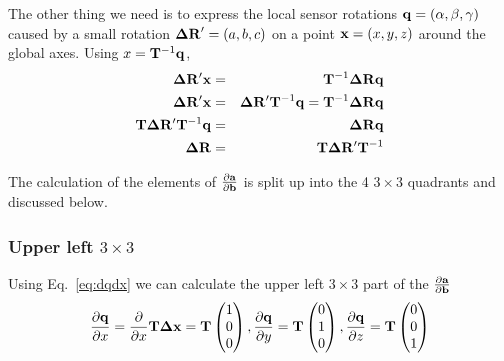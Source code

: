 \documentclass{article}
\def\vec#1{\ensuremath{\mathrm{\bf #1}}}
\def\partder#1#2{\ensuremath{\frac{\partial #1}{\partial #2}}}
\begin{document}
The other thing we need is to express the local sensor rotations $\vec{q}=\left(\alpha, \beta, \gamma \right)$ caused by a small rotation $\vec{\Delta R}'=\left(a,b,c\right)$ on a point $\vec{x}=\left(x,y,z\right)$ around the global axes. Using $x = \vec{T}^{-1}\vec{q}$, 
\begin{eqnarray}
\vec{\Delta R'} \vec{x} &=& \vec{T}^{-1} \vec{\Delta R} \vec{q} \nonumber \\
\vec{\Delta R'} \vec{x} &=& \vec{\Delta R'} \vec{T}^{-1} \vec{q}  =  \vec{T}^{-1} \vec{\Delta R} \vec{q} \nonumber \\
\vec{T} \vec{\Delta R'} \vec{T}^{-1} \vec{q}  &=&  \vec{\Delta R} \vec{q} \nonumber \\
\vec{\Delta R} &=& \vec{T} \vec{\Delta R'} \vec{T}^{-1} 
\label{eq:drdr}
\end{eqnarray}
 
 
 
 
The calculation of the elements of $\partder{\vec{a}}{\vec{b}}$ is split up into the 4 $3\times3$ quadrants and discussed below. 
 
 \subsubsection*{Upper left $3\times3$}
 
 Using Eq.~\ref{eq:dqdx} we can calculate the upper left $3\times3$ part of the \partder{\vec{a}}{\vec{b}} 
 \[
\partder{\vec{q}}{x} = \partder{}{x} \vec{T} \vec{\Delta x}  =  \vec{T}  
\begin{pmatrix}
1 \\
0 \\
0 \\
\end{pmatrix},
\partder{\vec{q}}{y} =  \vec{T}  
\begin{pmatrix}
0 \\
1 \\
0 \\
\end{pmatrix},
\partder{\vec{q}}{z} =  \vec{T}  
\begin{pmatrix}
0 \\
0 \\
1 \\
\end{pmatrix}
\]
\end{document}
